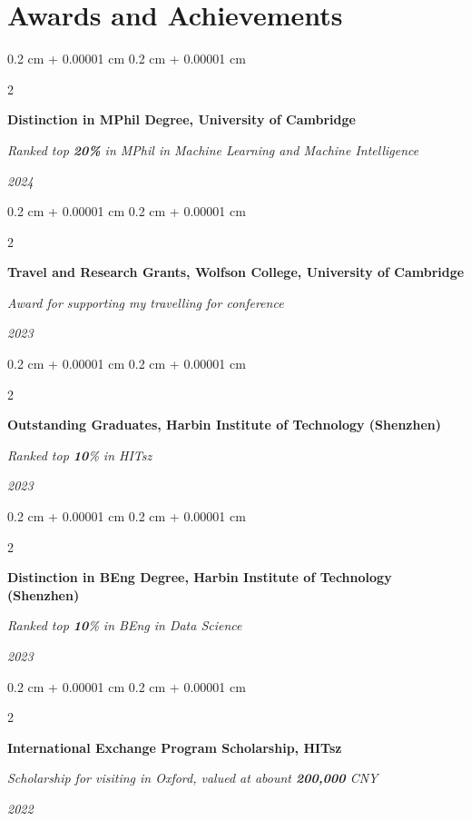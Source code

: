 \documentclass[10pt, letterpaper]{article}
\newenvironment{highlights}{
    \begin{itemize}[
        topsep=0.10 cm,
        parsep=0.10 cm,
        partopsep=0pt,
        itemsep=0pt,
        leftmargin=0.4 cm + 10pt
    ]
}{
    \end{itemize}
} %
\newenvironment{onecolentry}{
    \begin{adjustwidth}{
        0.2 cm + 0.00001 cm
    }{
        0.2 cm + 0.00001 cm
    }
}{
    \end{adjustwidth}
} %
\newenvironment{twocolentry}[2][]{
    \onecolentry
    \def\secondColumn{#2}
    \setcolumnwidth{\fill, 4.5 cm}
    \begin{paracol}{2}
}{
    \switchcolumn \raggedleft \secondColumn
    \end{paracol}
    \endonecolentry
} %
\let\hrefWithoutArrow\href
\renewcommand{\href}[2]{\hrefWithoutArrow{#1}{\ifthenelse{\equal{#2}{}}{ }{#2 }\raisebox{.15ex}{\footnotesize \faExternalLink*}}}
\begin{document}
    
\section{Awards and Achievements}
\begin{twocolentry}
    {\textit{2024}}

    {\textbf{Distinction in MPhil Degree, University of Cambridge}}
    
    \textit{Ranked top \textbf{20\%} in MPhil in Machine Learning and Machine Intelligence}
\end{twocolentry}
\begin{twocolentry}
    {\textit{2023}}

    {\textbf{Travel and Research Grants, Wolfson College, University of Cambridge}}
    
    \textit{Award for supporting my travelling for conference}
\end{twocolentry}
\begin{twocolentry}
    {\textit{2023}}

    {\textbf{Outstanding Graduates, Harbin Institute of Technology (Shenzhen)}}
    
    \textit{Ranked top \textbf{10}\% in HITsz}
\end{twocolentry}
\begin{twocolentry}
    {\textit{2023}}

    {\textbf{Distinction in BEng Degree, Harbin Institute of Technology (Shenzhen)}}
    
    \textit{Ranked top \textbf{10}\% in BEng in Data Science}
\end{twocolentry}
\begin{twocolentry}
    {\textit{2022}}

    {\textbf{International Exchange Program Scholarship, HITsz}}
    
    \textit{Scholarship for visiting in Oxford, valued at abount \textbf{200,000} CNY}
\end{twocolentry}
\end{document}
